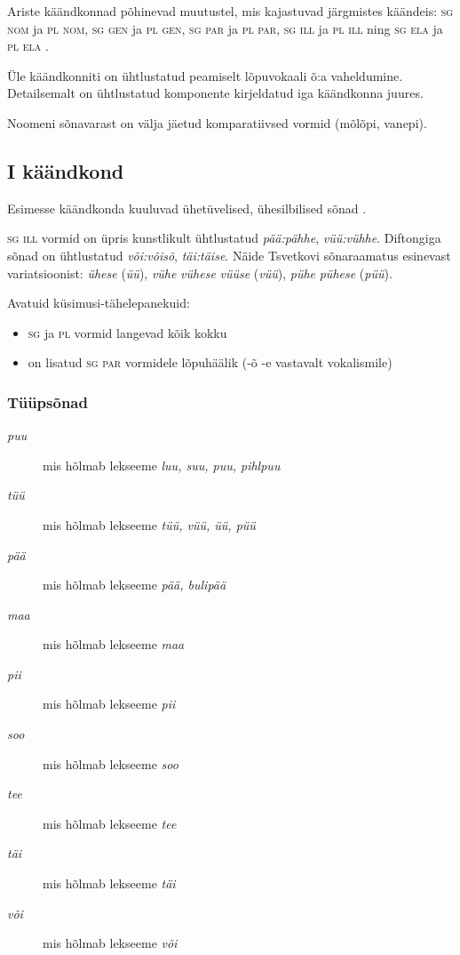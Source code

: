 \documentclass[12pt,a4paper]{article}
\newcommand{\vadja}[1]{\textit{#1}}
\newcommand{\msd}[1]{\textsc{#1}}
\begin{document}
Ariste käändkonnad põhinevad muutustel, mis kajastuvad järgmistes käändeis: \msd{sg nom} ja \msd{pl nom}, \msd{sg gen} ja \msd{pl gen}, \msd{sg par} ja \msd{pl par}, \msd{sg ill} ja \msd{pl ill} ning \msd{sg ela} ja \msd{pl ela} \cite[42]{ariste_grammar_1968}.

Üle käändkonniti on ühtlustatud peamiselt lõpuvokaali õ:a vaheldumine. Detailsemalt on ühtlustatud komponente kirjeldatud iga käändkonna juures.

Noomeni sõnavarast on välja jäetud komparatiivsed vormid (mõlõpi, vanepi). 

\subsection{\RN{1} käändkond}

Esimesse käändkonda kuuluvad ühetüvelised, ühesilbilised sõnad \cite[40]{ariste_grammar_1968}.

\msd{sg ill} vormid on üpris kunstlikult ühtlustatud \textit{pää:pähhe}, \textit{vüü:vühhe}. Diftongiga sõnad on ühtlustatud \textit{või:võisõ}, \textit{täi:täise}. Näide Tsvetkovi sõnaraamatus esinevast variatsioonist: \vadja{ühese} (\vadja{üü}), \vadja{vühe} \texttildelow \vadja{vühese} \texttildelow \vadja{vüüse} (\vadja{vüü}), \vadja{pühe} \texttildelow \vadja{pühese} (\vadja{püü}).

Avatuid küsimusi-tähelepanekuid:
\begin{itemize}
\item \msd{sg} ja \msd{pl} vormid langevad kõik kokku
\item on lisatud \msd{sg par} vormidele lõpuhäälik (-õ -e vastavalt vokalismile)
\end{itemize}

\subsubsection*{Tüüpsõnad}

\begin{description}
\item [\vadja{puu}] mis hõlmab lekseeme \vadja{luu, suu, puu, pihlpuu}
\item [\vadja{tüü}] mis hõlmab lekseeme \vadja{tüü, vüü, üü, püü}
\item [\vadja{pää}] mis hõlmab lekseeme \vadja{pää, bulipää}
\item [\vadja{maa}] mis hõlmab lekseeme \vadja{maa}
\item [\vadja{pii}] mis hõlmab lekseeme \vadja{pii}
\item [\vadja{soo}] mis hõlmab lekseeme \vadja{soo}
\item [\vadja{tee}] mis hõlmab lekseeme \vadja{tee}
\item [\vadja{täi}] mis hõlmab lekseeme \vadja{täi}
\item [\vadja{või}] mis hõlmab lekseeme \vadja{või}
\end{description}
\end{document}
